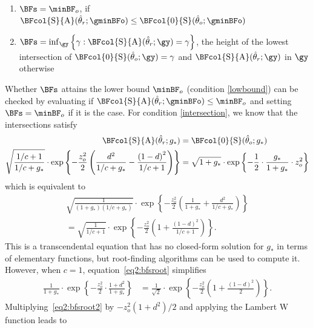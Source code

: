 \begin{subappendices}
\begin{enumerate}
  \item \label{lowbound} $\BFs = \minBF_{o}$, if
  $\BFcol{\text{S}}{\text{A}}(\hat{\theta}_r; \gminBFo) \leq
  \BFcol{0}{\text{S}}(\hat{\theta}_o; \gminBFo)$

  \item \label{intersection}
  $\BFs = \inf_{\gy}
  \left\{\gamma : \BFcol{\text{S}}{\text{A}}(\hat{\theta}_r; \gy)
  = \gamma\right\}$,
  the height of the lowest intersection of
  \mbox{$\BFcol{0}{\text{S}}(\hat{\theta}_o; \gy) = \gamma$} and
  $\BFcol{\text{S}}{\text{A}}(\hat{\theta}_r; \gy)$
  in $\gy$ otherwise
\end{enumerate}
Whether $\BFs$ attains the lower bound $\minBF_{o}$ (condition \ref{lowbound})
can be checked by evaluating if
$\BFcol{\text{S}}{\text{A}}(\hat{\theta}_r; \gminBFo) \leq \minBF_{o}$ and setting
$\BFs = \minBF_{o}$ if it is the case. For condition \ref{intersection}, we know
that the intersections satisfy
\begin{align*}
  \BFcol{\text{S}}{\text{A}}(\hat{\theta}_r; g_*) &=
  \BFcol{0}{\text{S}}(\hat{\theta}_o; g_*) \\
  \sqrt{\frac{1/c + 1}{1/c + g_*}} \cdot
  \exp\left\{-\frac{z_{o}^{2}}{2}\left(\frac{d^2}{1/c + g_*} -
  \frac{\left(1 - d\right)^2}{1/c + 1} \right)\right\}
  &= \sqrt{1 + g_*} \cdot
  \exp\left\{-\frac{1}{2} \cdot \frac{g_*}{1 + g_*} \cdot z^2_o\right\}
\end{align*}
which is equivalent to
\begin{align}
  \sqrt{\frac{1}{(1 + g_*)(1/c + g_*)}}\cdot\exp\left\{-\frac{z_{o}^{2}}{2}\left(
  \frac{1}{1 + g_*} + \frac{d^{2}}{1/c + g_*}\right)\right\} \nonumber \\
  = \sqrt{\frac{1}{1/c + 1}}\cdot\exp\left\{-\frac{z_{o}^{2}}{2}\left(
  1 + \frac{(1 - d)^{2}}{1/c + 1}\right)\right\}.
  \label{eq2:bfsroot}
\end{align}
This is a transcendental equation that has no closed-form solution for $g_*$ in
terms of elementary functions, but root-finding algorithms can be used to
compute it. However, when $c = 1$, equation~\eqref{eq2:bfsroot} simplifies
\begin{align}
  \label{eq2:bfsroot2}
  \frac{1}{1 + g_*}\cdot\exp\left\{-\frac{z_{o}^{2}}{2} \cdot
  \frac{1 + d^{2}}{1 + g_*}\right\}
  &= \frac{1}{\sqrt{2}}\cdot\exp\left\{-\frac{z_{o}^{2}}{2}\left(
  1 + \frac{(1 - d)^{2}}{2}\right)\right\}.
\end{align}
Multiplying~\eqref{eq2:bfsroot2} by $-z_{o}^{2}(1 + d^{2})/2$ and applying the
Lambert W function leads to

\end{subappendices}
